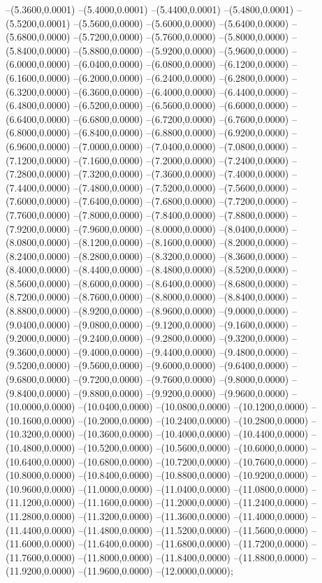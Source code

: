 {	--(5.3600,0.0001)
	--(5.4000,0.0001)
	--(5.4400,0.0001)
	--(5.4800,0.0001)
	--(5.5200,0.0001)
	--(5.5600,0.0000)
	--(5.6000,0.0000)
	--(5.6400,0.0000)
	--(5.6800,0.0000)
	--(5.7200,0.0000)
	--(5.7600,0.0000)
	--(5.8000,0.0000)
	--(5.8400,0.0000)
	--(5.8800,0.0000)
	--(5.9200,0.0000)
	--(5.9600,0.0000)
	--(6.0000,0.0000)
	--(6.0400,0.0000)
	--(6.0800,0.0000)
	--(6.1200,0.0000)
	--(6.1600,0.0000)
	--(6.2000,0.0000)
	--(6.2400,0.0000)
	--(6.2800,0.0000)
	--(6.3200,0.0000)
	--(6.3600,0.0000)
	--(6.4000,0.0000)
	--(6.4400,0.0000)
	--(6.4800,0.0000)
	--(6.5200,0.0000)
	--(6.5600,0.0000)
	--(6.6000,0.0000)
	--(6.6400,0.0000)
	--(6.6800,0.0000)
	--(6.7200,0.0000)
	--(6.7600,0.0000)
	--(6.8000,0.0000)
	--(6.8400,0.0000)
	--(6.8800,0.0000)
	--(6.9200,0.0000)
	--(6.9600,0.0000)
	--(7.0000,0.0000)
	--(7.0400,0.0000)
	--(7.0800,0.0000)
	--(7.1200,0.0000)
	--(7.1600,0.0000)
	--(7.2000,0.0000)
	--(7.2400,0.0000)
	--(7.2800,0.0000)
	--(7.3200,0.0000)
	--(7.3600,0.0000)
	--(7.4000,0.0000)
	--(7.4400,0.0000)
	--(7.4800,0.0000)
	--(7.5200,0.0000)
	--(7.5600,0.0000)
	--(7.6000,0.0000)
	--(7.6400,0.0000)
	--(7.6800,0.0000)
	--(7.7200,0.0000)
	--(7.7600,0.0000)
	--(7.8000,0.0000)
	--(7.8400,0.0000)
	--(7.8800,0.0000)
	--(7.9200,0.0000)
	--(7.9600,0.0000)
	--(8.0000,0.0000)
	--(8.0400,0.0000)
	--(8.0800,0.0000)
	--(8.1200,0.0000)
	--(8.1600,0.0000)
	--(8.2000,0.0000)
	--(8.2400,0.0000)
	--(8.2800,0.0000)
	--(8.3200,0.0000)
	--(8.3600,0.0000)
	--(8.4000,0.0000)
	--(8.4400,0.0000)
	--(8.4800,0.0000)
	--(8.5200,0.0000)
	--(8.5600,0.0000)
	--(8.6000,0.0000)
	--(8.6400,0.0000)
	--(8.6800,0.0000)
	--(8.7200,0.0000)
	--(8.7600,0.0000)
	--(8.8000,0.0000)
	--(8.8400,0.0000)
	--(8.8800,0.0000)
	--(8.9200,0.0000)
	--(8.9600,0.0000)
	--(9.0000,0.0000)
	--(9.0400,0.0000)
	--(9.0800,0.0000)
	--(9.1200,0.0000)
	--(9.1600,0.0000)
	--(9.2000,0.0000)
	--(9.2400,0.0000)
	--(9.2800,0.0000)
	--(9.3200,0.0000)
	--(9.3600,0.0000)
	--(9.4000,0.0000)
	--(9.4400,0.0000)
	--(9.4800,0.0000)
	--(9.5200,0.0000)
	--(9.5600,0.0000)
	--(9.6000,0.0000)
	--(9.6400,0.0000)
	--(9.6800,0.0000)
	--(9.7200,0.0000)
	--(9.7600,0.0000)
	--(9.8000,0.0000)
	--(9.8400,0.0000)
	--(9.8800,0.0000)
	--(9.9200,0.0000)
	--(9.9600,0.0000)
	--(10.0000,0.0000)
	--(10.0400,0.0000)
	--(10.0800,0.0000)
	--(10.1200,0.0000)
	--(10.1600,0.0000)
	--(10.2000,0.0000)
	--(10.2400,0.0000)
	--(10.2800,0.0000)
	--(10.3200,0.0000)
	--(10.3600,0.0000)
	--(10.4000,0.0000)
	--(10.4400,0.0000)
	--(10.4800,0.0000)
	--(10.5200,0.0000)
	--(10.5600,0.0000)
	--(10.6000,0.0000)
	--(10.6400,0.0000)
	--(10.6800,0.0000)
	--(10.7200,0.0000)
	--(10.7600,0.0000)
	--(10.8000,0.0000)
	--(10.8400,0.0000)
	--(10.8800,0.0000)
	--(10.9200,0.0000)
	--(10.9600,0.0000)
	--(11.0000,0.0000)
	--(11.0400,0.0000)
	--(11.0800,0.0000)
	--(11.1200,0.0000)
	--(11.1600,0.0000)
	--(11.2000,0.0000)
	--(11.2400,0.0000)
	--(11.2800,0.0000)
	--(11.3200,0.0000)
	--(11.3600,0.0000)
	--(11.4000,0.0000)
	--(11.4400,0.0000)
	--(11.4800,0.0000)
	--(11.5200,0.0000)
	--(11.5600,0.0000)
	--(11.6000,0.0000)
	--(11.6400,0.0000)
	--(11.6800,0.0000)
	--(11.7200,0.0000)
	--(11.7600,0.0000)
	--(11.8000,0.0000)
	--(11.8400,0.0000)
	--(11.8800,0.0000)
	--(11.9200,0.0000)
	--(11.9600,0.0000)
	--(12.0000,0.0000);
}
